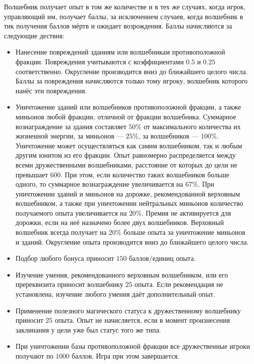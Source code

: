 Волшебник получает опыт в том же количестве и в тех же случаях, когда игрок, управляющий им, получает баллы, за исключением случаев, когда
волшебник в тик получения баллов мёртв и ожидает возрождения. Баллы начисляются за следующие дествия:
\begin{itemize}
    \item Нанесение повреждений зданиям или волшебникам противоположной фракции. Повреждения учитываются с коэффициентами $0.5$ и $0.25$
        соответственно. Округление производится вниз до ближайшего целого числа. Баллы за повреждения начисляются только тому игроку,
        волшебник которого нанёс эти повреждения.
    \item Уничтожение зданий или волшебников противоположной фракции, а также миньонов любой фракции, отличной от фракции волшебника.
        Суммарное вознаграждение за здания составляет $50\%$ от максимального количества их жизненной энергии, за миньонов --- $25\%$, за
        волшебников --- $100\%$. Уничтожение может осуществляться как самим волшебником, так и любым другим юнитом из его фракции. Опыт
        равномерно распределяется между всеми дружественными волшебниками, расстояние от которых до цели не превышает $600$. При этом, если
        количество таких волшебников больше одного, то суммарное вознаграждение увеличивается на $67\%$. При уничтожении зданий и миньонов
        на дорожке, рекомендованной верховным волшебником, а также при уничтожении нейтральных миньонов количество получаемого опыта
        увеличивается на $20\%$. Премия не активируется для дорожки, если на неё назначено более двух волшебников. Верховный волшебник
        всегда получает на $20\%$ больше опыта за уничтожение миньонов и зданий. Округление опыта производится вниз до ближайшего целого
        числа.
    \item Подбор любого бонуса приносит $150$ баллов/единиц опыта.
    \item Изучение умения, рекомендованного верховным волшебником, или его пререквизита приносит волшебнику $25$ опыта. Если рекомендация
        не установлена, изучение любого умения даёт дополнительный опыт.
    \item Применение полезного магического статуса к дружественному волшебнику приносит $25$ опыта. Опыт не начисляется, если в момент
        произнесения заклинания у цели уже был статус того же типа.
    \item При уничтожении базы противоположной фракции все дружественные игроки получают по $1000$ баллов. Игра при этом завершается.
\end{itemize}

